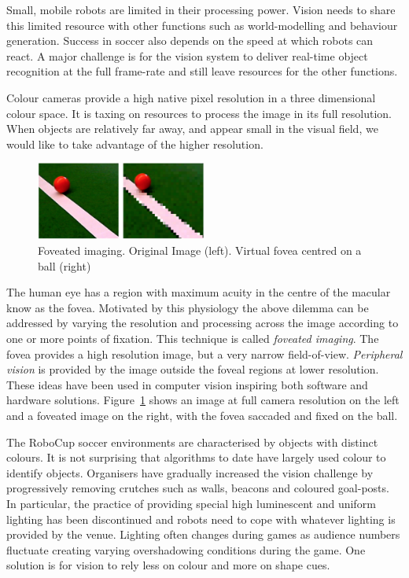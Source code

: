 \documentclass[runningheads,a4paper]{llncs}
\begin{document}
Small, mobile robots are limited in their processing power. Vision
needs to share this limited resource with other functions such as
world-modelling and behaviour generation. Success in soccer also depends on the
speed at which robots can react. A major challenge is for the vision system to
deliver real-time object recognition at the full frame-rate and still leave
resources for the other functions. 

Colour cameras provide a high native pixel resolution in a three
dimensional colour space. It is taxing on resources to process the image in its
full resolution. When objects are relatively far away, and appear small in the
visual field, we would like to take advantage of the higher resolution. 

\begin{figure}
\centering
\includegraphics[width=0.5\textwidth]{figures/figFov}
\caption{Foveated imaging. Original Image (left). Virtual fovea centred on a ball (right) } \label{figFov}
\end{figure}

The human eye has a region with maximum acuity in the centre of the macular know
as the fovea. Motivated by this physiology the above dilemma can be addressed by
varying the resolution and processing across the image according to one or more
points of fixation. This technique is called \emph{foveated imaging}. The fovea
provides a high resolution image, but a very narrow field-of-view.
\emph{Peripheral vision} is provided by the image outside the foveal regions at
lower resolution. These ideas have been used in computer vision inspiring both
software and hardware solutions.\cite{724279} Figure~\ref{figFov} shows an
image at full camera resolution on the left and a foveated image on the right,
with the fovea saccaded and fixed on the ball. 

The RoboCup soccer environments are characterised by objects with distinct colours. It is not surprising that algorithms to date have largely used colour to identify objects. Organisers have gradually increased the vision challenge by progressively removing crutches such as walls, beacons and coloured goal-posts. In particular, the practice of providing special high luminescent and uniform lighting has been discontinued and robots need to cope with whatever lighting is provided by the venue. Lighting often changes during games as audience numbers fluctuate creating varying overshadowing conditions during the game. One solution is for vision to rely less on colour and more on shape cues. 
\end{document}
